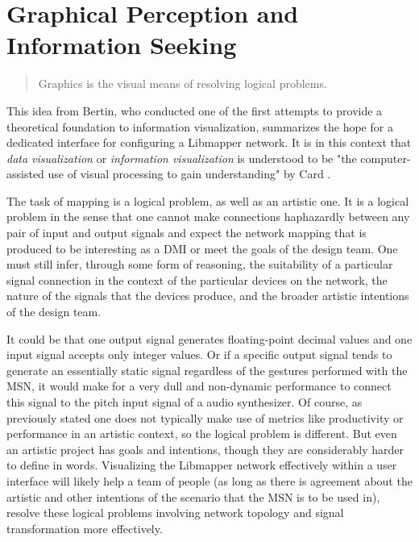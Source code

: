 \section{Graphical Perception and Information Seeking}

\begin{quote}
Graphics is the visual means of resolving logical problems. \cite{bertin1981}
\end{quote}

This idea from Bertin, who conducted one of the first attempts to provide a theoretical foundation to information visualization, summarizes the hope for a dedicated interface for configuring a Libmapper network. It is in this context that \emph{data visualization} or \emph{information visualization} is understood to be "the computer-assisted use of visual processing to gain understanding" by Card \cite{card1997}. 

The task of mapping is a logical problem, as well as an artistic one. It is a logical problem in the sense that one cannot make connections haphazardly between any pair of input and output signals and expect the network mapping that is produced to be interesting as a DMI or meet the goals of the design team. One must still infer, through some form of reasoning, the suitability of a particular signal connection in the context of the particular devices on the network, the nature of the signals that the devices produce, and the broader artistic intentions of the design team. 

It could be that one output signal generates floating-point decimal values and one input signal accepts only integer values. Or if a specific output signal tends to generate an essentially static signal regardless of the gestures performed with the MSN, it would make for a very dull and non-dynamic performance to connect this signal to the pitch input signal of a audio synthesizer. Of course, as previously stated one does not typically make use of metrics like productivity or performance in an artistic context, so the logical problem is different. But even an artistic project has goals and intentions, though they are considerably harder to define in words. Visualizing the Libmapper network effectively within a user interface will likely help a team of people (as long as there is agreement about the artistic and other intentions of the scenario that the MSN is to be used in), resolve these logical problems involving network topology and signal transformation more effectively. 

